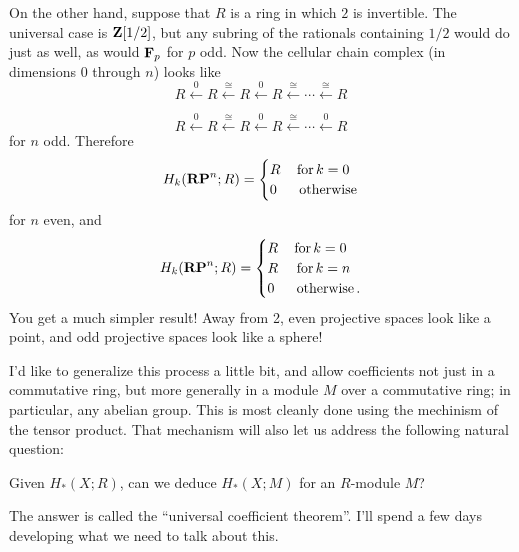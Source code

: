 On the other hand, suppose that $R$ is a ring in which $2$ is invertible.
The universal case is $\mathbf Z[1/2]$, but any subring of the rationals containing
$1/2$ would do just as well, as would $\mathbf F_p$ for $p$ odd. 
Now the cellular chain complex (in dimensions 0 through $n$)
looks like
\[
R\xleftarrow{0}R\xleftarrow{\cong}R\xleftarrow{0}R
\xleftarrow{\cong}\cdots\xleftarrow{\cong}R
\]

\[
R\xleftarrow{0}R\xleftarrow{\cong}R\xleftarrow{0}R
\xleftarrow{\cong}\cdots\xleftarrow{0}R
\]
for $n$ odd. Therefore
\[
H_k(\mathbf{RP}^n;R)=
\begin{cases}R\,&\hbox{for}\,k=0\\0\,&\,\hbox{otherwise}\end{cases}
\]
for $n$ even, and 
\[
H_k(\mathbf{RP}^n;R)=
\begin{cases}R\,&\hbox{for}\,k=0\\
R\,&\,\hbox{for}\,k=n\\
0\,&\,\hbox{otherwise}\,.
\end{cases}
\]
You get a much simpler result! Away from 2, even projective spaces look like a point, and odd projective spaces look like a sphere!

I'd like to generalize this process a little bit, and allow coefficients 
not just in
a commutative ring, but more generally in a module $M$ over a commutative ring;
in particular, any abelian group. This is most cleanly done using the
mechinism of the tensor product. That mechanism will also let us address
the following natural question: 
\begin{question}
Given $H_*(X;R)$, can we deduce $H_*(X;M)$ for an $R$-module $M$?
\end{question}
The answer is called the ``universal coefficient theorem''. I'll spend a few days developing what we need to talk about this.




